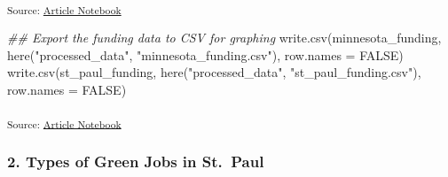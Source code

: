 \documentclass[
  letterpaper,
  DIV=11,
  numbers=noendperiod]{scrartcl}
\newenvironment{Shaded}{\begin{snugshade}}{\end{snugshade}}
\newcommand{\AttributeTok}[1]{\textcolor[rgb]{0.40,0.45,0.13}{#1}}
\newcommand{\ConstantTok}[1]{\textcolor[rgb]{0.56,0.35,0.01}{#1}}
\newcommand{\DocumentationTok}[1]{\textcolor[rgb]{0.37,0.37,0.37}{\textit{#1}}}
\newcommand{\FunctionTok}[1]{\textcolor[rgb]{0.28,0.35,0.67}{#1}}
\newcommand{\NormalTok}[1]{\textcolor[rgb]{0.00,0.23,0.31}{#1}}
\newcommand{\StringTok}[1]{\textcolor[rgb]{0.13,0.47,0.30}{#1}}
\begin{document}
\textsubscript{Source:
\href{https://beeckcenter.github.io/climate-equity-workforce/index-preview.html}{Article
Notebook}}

\begin{Shaded}
\begin{Highlighting}[]
\DocumentationTok{\#\# Export the funding data to CSV for graphing}
\FunctionTok{write.csv}\NormalTok{(minnesota\_funding, }\FunctionTok{here}\NormalTok{(}\StringTok{"processed\_data"}\NormalTok{, }\StringTok{"minnesota\_funding.csv"}\NormalTok{), }\AttributeTok{row.names =} \ConstantTok{FALSE}\NormalTok{)}
\FunctionTok{write.csv}\NormalTok{(st\_paul\_funding, }\FunctionTok{here}\NormalTok{(}\StringTok{"processed\_data"}\NormalTok{, }\StringTok{"st\_paul\_funding.csv"}\NormalTok{), }\AttributeTok{row.names =} \ConstantTok{FALSE}\NormalTok{)}
\end{Highlighting}
\end{Shaded}

\textsubscript{Source:
\href{https://beeckcenter.github.io/climate-equity-workforce/index-preview.html}{Article
Notebook}}

\subsubsection{2. Types of Green Jobs in
St.~Paul}\label{types-of-green-jobs-in-st.-paul}
\end{document}
